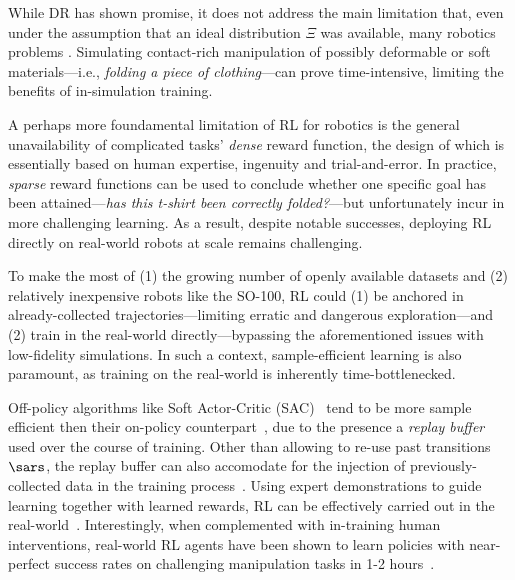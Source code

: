 While DR has shown promise, it does not address the main limitation that, even under the assumption that an ideal distribution \( \Xi \) was available, many robotics problems .
Simulating contact-rich manipulation of possibly deformable or soft materials---i.e., \emph{folding a piece of clothing}---can prove time-intensive, limiting the benefits of in-simulation training.

A perhaps more foundamental limitation of RL for robotics is the general unavailability of complicated tasks' \emph{dense} reward function, the design of which is essentially based on human expertise, ingenuity and trial-and-error.
In practice, \emph{sparse} reward functions can be used to conclude whether one specific goal has been attained---\emph{has this t-shirt been correctly folded?}---but unfortunately incur in more challenging learning.
As a result, despite notable successes, deploying RL directly on real-world robots at scale remains challenging.

To make the most of (1) the growing number of openly available datasets and (2) relatively inexpensive robots like the SO-100, RL could (1) be anchored in already-collected trajectories---limiting erratic and dangerous exploration---and (2) train in the real-world directly---bypassing the aforementioned issues with low-fidelity simulations.
In such a context, sample-efficient learning is also paramount, as training on the real-world is inherently time-bottlenecked.

Off-policy algorithms like Soft Actor-Critic (SAC)~\citep{haarnojaSoftActorCriticOffPolicy2018} tend to be more sample efficient then their on-policy counterpart~\citep{schulmanProximalPolicyOptimization2017}, due to the presence a \emph{replay buffer} used over the course of training.
Other than allowing to re-use past transitions \( \sars \), the replay buffer can also accomodate for the injection of previously-collected data in the training process~\citep{ballEfficientOnlineReinforcement2023}.
Using expert demonstrations to guide learning together with learned rewards, RL can be effectively carried out in the real-world~\citep{luoSERLSoftwareSuite2025}.
Interestingly, when complemented with in-training human interventions, real-world RL agents have been shown to learn policies with near-perfect success rates on challenging manipulation tasks in 1-2 hours~\citep{luoPreciseDexterousRobotic2024}.

